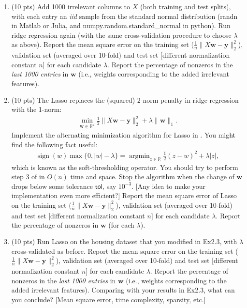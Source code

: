 \documentclass[10pt,letter,notitlepage]{article}
\newcommand{\RR}{\mathds{R}}
\newcommand{\sign}{\mathop{\mathrm{sign}}}
\newcommand{\argmin}{\mathop{\mathrm{argmin}}}
\newcommand{\wv}{\mathbf{w}}
\newcommand{\yv}{\mathbf{y}}
\newcommand{\ie}{{i.e.}\xspace}
\newcommand{\etc}{{etc.}\xspace}
\newcounter{exercise}
\begin{document}
\begin{exercise}
\begin{enumerate}
	\item (10 pts) Add 1000 irrelevant columns to $X$ (both training and test splits), with each entry an \emph{iid} sample from the standard normal distribution (\textsf{randn} in \textsf{Matlab} or \textsf{Julia}, and \textsf{numpy.random.standard\_normal} in \textsf{python}). Run ridge regression again (with the same cross-validation procedure to choose $\lambda$ as above). Report the mean square error on the training set ($\tfrac{1}{n}\|X\wv - \yv\|_2^2$), validation set (averaged over 10-fold) and test set [different normalization constant $n$] for each candidate $\lambda$. Report the percentage of nonzeros in the \emph{last 1000 entries} in $\wv$ (\ie, weights corresponding to the added irrelevant features).
		
	\item (10 pts) The Lasso replaces the (squared) 2-norm penalty in ridge regression with the 1-norm:
\begin{align}
\min_{\wv\in\RR^d} \tfrac{1}{2}\|X\wv - \yv\|_2^2 + \lambda \|\wv\|_1.
\end{align}
Implement the alternating minimization algorithm for Lasso in . You might find the following fact useful:
\begin{align}
\sign(w) \max\{0, |w|-\lambda\} = \argmin_{z \in \RR} \tfrac{1}{2}(z - w)^2 + \lambda |z|,
\end{align}
which is known as the soft-thresholding operator. You should try to perform step 3 of  in $O(n)$ time and space. Stop the algorithm when the change of $\wv$ drops below some tolerance $\mathsf{tol}$, say $10^{-3}$. [Any idea to make your implementation even more efficient?]
Report the mean square error of Lasso on the training set ($\tfrac{1}{n}\|X\wv - \yv\|_2^2$), validation set (averaged over 10-fold) and test set [different normalization constant $n$] for each candidate $\lambda$. Report the percentage of nonzeros in $\wv$ (for each $\lambda$).

\item (10 pts) Run Lasso on the \textsf{housing} dataset that you modified in Ex2.3, with $\lambda$ cross-validated as before. Report the mean square error on the training set ($\tfrac{1}{n}\|X\wv - \yv\|_2^2$), validation set (averaged over 10-fold) and test set [different normalization constant $n$] for each candidate $\lambda$. Report the percentage of nonzeros in the \emph{last 1000 entries} in $\wv$ (\ie, weights corresponding to the added irrelevant features). Comparing with your results in Ex2.3, what can you conclude? [Mean square error, time complexity, sparsity, \etc]
	
\end{enumerate}
\end{exercise}
\end{document}
